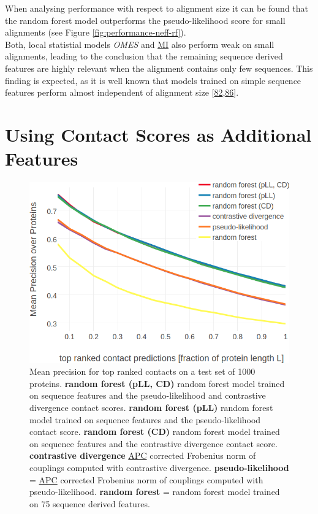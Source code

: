\documentclass[11pt,a4paper,twoside]{book}
\theoremstyle{definition}
\theoremstyle{definition}
\theoremstyle{remark}
\begin{document}
When analysing performance with respect to alignment size it can be
found that the random forest model outperforms the pseudo-likelihood
score for small alignments (see Figure \ref{fig:performance-neff-rf}).\\
Both, local statistial models \emph{OMES} and
\protect\hyperlink{abbrev}{MI} also perform weak on small alignments,
leading to the conclusion that the remaining sequence derived features
are highly relevant when the alignment contains only few sequences. This
finding is expected, as it is well known that models trained on simple
sequence features perform almost independent of alignment size
{[}\protect\hyperlink{ref-Skwark2016}{82},\protect\hyperlink{ref-Stahl2017}{86}{]}.

\section{Using Contact Scores as Additional
Features}\label{contact-prior-add-features}















\begin{figure}
\includegraphics[width=0.9\linewidth]{img/random_forest_contact_prior/additional_contat_score_features/precision_vs_rank_rf_pll_cd} \caption{Mean precision for top
ranked contacts on a test set of 1000 proteins. \textbf{random forest
(pLL, CD)} random forest model trained on sequence features and the
pseudo-likelihood and contrastive divergence contact scores.
\textbf{random forest (pLL)} random forest model trained on sequence
features and the pseudo-likelihood contact score. \textbf{random forest
(CD)} random forest model trained on sequence features and the
contrastive divergence contact score. \textbf{contrastive divergence}
\protect\hyperlink{abbrev}{APC} corrected Frobenius norm of couplings
computed with contrastive divergence. \textbf{pseudo-likelihood} =
\protect\hyperlink{abbrev}{APC} corrected Frobenius norm of couplings
computed with pseudo-likelihood. \textbf{random forest} = random forest
model trained on 75 sequence derived features.}\label{fig:performance-rf-additional-features}
\end{figure}
\end{document}
